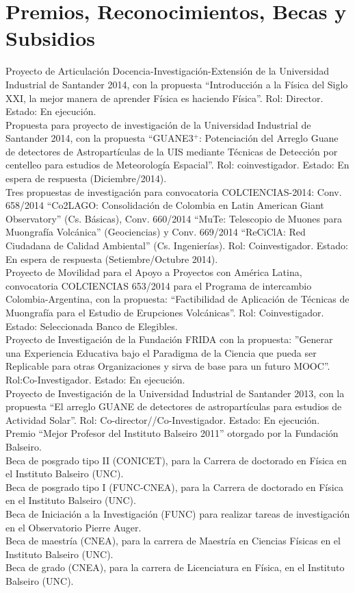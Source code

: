 \section*{Premios, Reconocimientos, Becas y Subsidios}
\noindent
{} Proyecto de Articulación Docencia-Investigación-Extensión de la Universidad Industrial de Santander 2014, con la propuesta ``Introducción a la Física del Siglo XXI, la mejor manera de aprender Física es haciendo Física''. Rol: Director. Estado: En ejecución.\\
 Propuesta para proyecto de investigación de la Universidad Industrial de Santander 2014, con la propuesta ``GUANE3$^+$: Potenciación del Arreglo Guane de detectores de Astropartículas de la UIS mediante Técnicas de Detección por centelleo para estudios de Meteorología Espacial''. Rol: coinvestigador. Estado: En espera de respuesta (Diciembre/2014).\\
 Tres propuestas de investigación para convocatoria COLCIENCIAS-2014: Conv. 658/2014 ``Co2LAGO: Consolidación de Colombia en Latin American Giant Observatory'' (Cs. Básicas), Conv. 660/2014 ``MuTe: Telescopio de Muones para Muongrafía Volcánica'' (Geociencias) y Conv. 669/2014 ``ReCiClA: Red Ciudadana de Calidad Ambiental'' (Cs. Ingenierías). Rol: Coinvestigador. Estado: En espera de respuesta (Setiembre/Octubre 2014).\\
 Proyecto de Movilidad para el Apoyo a Proyectos con América Latina, convocatoria COLCIENCIAS 653/2014 para el Programa de intercambio Colombia-Argentina, con la propuesta: ``Factibilidad de Aplicación de Técnicas de Muongrafía para el Estudio de Erupciones Volcánicas''. Rol: Coinvestigador. Estado: Seleccionada Banco de Elegibles.\\
 Proyecto de Investigación de la Fundación FRIDA con la propuesta: ''Generar una Experiencia Educativa bajo el Paradigma de la Ciencia que pueda ser Replicable para otras Organizaciones y sirva de base para un futuro MOOC''. Rol:Co-Investigador. Estado: En ejecución.\\
 Proyecto de Investigación de la Universidad Industrial de Santander 2013, con la propuesta ``El arreglo GUANE de detectores de astropartículas para estudios de Actividad Solar''. Rol: Co-director//Co-Investigador. Estado: En ejecución.\\
Premio ``Mejor Profesor del Instituto Balseiro 2011'' otorgado por la Fundación Balseiro.\\
Beca de posgrado tipo II (CONICET), para la Carrera de doctorado en Física en el Instituto Balseiro (UNC).\\
Beca de posgrado tipo I (FUNC-CNEA), para la Carrera de doctorado en Física en el Instituto Balseiro (UNC).\\
Beca de Iniciación a la Investigación (FUNC) para realizar tareas de investigación en el Observatorio Pierre Auger.\\
Beca de maestría (CNEA), para la carrera de Maestría en Ciencias Físicas en el Instituto Balseiro (UNC).\\
Beca de grado (CNEA), para la carrera de Licenciatura en Física, en el Instituto Balseiro (UNC).
\fi
